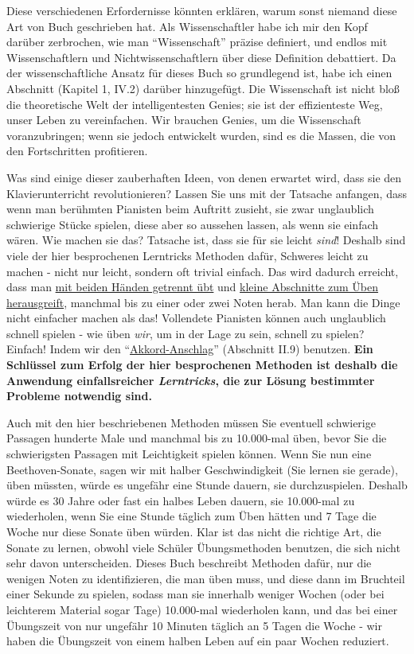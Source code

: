 Diese verschiedenen Erfordernisse könnten erklären, warum sonst niemand diese Art von Buch geschrieben hat.
Als Wissenschaftler habe ich mir den Kopf darüber zerbrochen, wie man \enquote{Wissenschaft} präzise definiert, und endlos mit Wissenschaftlern und Nichtwissenschaftlern über diese Definition debattiert.
Da der wissenschaftliche Ansatz für dieses Buch so grundlegend ist, habe ich einen Abschnitt (Kapitel 1, IV.2) darüber hinzugefügt.
Die Wissenschaft ist nicht bloß die theoretische Welt der intelligentesten Genies; sie ist der effizienteste Weg, unser Leben zu vereinfachen.
Wir brauchen Genies, um die Wissenschaft voranzubringen; wenn sie jedoch entwickelt wurden, sind es die Massen, die von den Fortschritten profitieren.

Was sind einige dieser zauberhaften Ideen, von denen erwartet wird, dass sie den Klavierunterricht revolutionieren?
Lassen Sie uns mit der Tatsache anfangen, dass wenn man berühmten Pianisten beim Auftritt zusieht, sie zwar unglaublich schwierige Stücke spielen, diese aber so aussehen lassen, als wenn sie einfach wären.
Wie machen sie das?
Tatsache ist, dass sie für sie leicht \textit{sind}!
Deshalb sind viele der hier besprochenen Lerntricks Methoden dafür, Schweres leicht zu machen - nicht nur leicht, sondern oft trivial einfach.
Das wird dadurch erreicht, dass man \hyperref[c1ii7]{mit beiden Händen getrennt übt} und \hyperref[c1ii6]{kleine Abschnitte zum Üben herausgreift}, manchmal bis zu einer oder zwei Noten herab.
Man kann die Dinge nicht einfacher machen als das!
Vollendete Pianisten können auch unglaublich schnell spielen - wie üben \textit{wir}, um in der Lage zu sein, schnell zu spielen?
Einfach!
Indem wir den \enquote{\hyperref[c1ii9]{Akkord-Anschlag}} (Abschnitt II.9) benutzen.
\textbf{Ein Schlüssel zum Erfolg der hier besprochenen Methoden ist deshalb die Anwendung einfallsreicher \textit{Lerntricks}, die zur Lösung bestimmter Probleme notwendig sind.}

Auch mit den hier beschriebenen Methoden müssen Sie eventuell schwierige Passagen hunderte Male und manchmal bis zu 10.000-mal üben, bevor Sie die schwierigsten Passagen mit Leichtigkeit spielen können.
Wenn Sie nun eine Beethoven-Sonate, sagen wir mit halber Geschwindigkeit (Sie lernen sie gerade), üben müssten, würde es ungefähr eine Stunde dauern, sie durchzuspielen.
Deshalb würde es 30 Jahre oder fast ein halbes Leben dauern, sie 10.000-mal zu wiederholen, wenn Sie eine Stunde täglich zum Üben hätten und 7 Tage die Woche nur diese Sonate üben würden.
Klar ist das nicht die richtige Art, die Sonate zu lernen, obwohl viele Schüler Übungsmethoden benutzen, die sich nicht sehr davon unterscheiden.
Dieses Buch beschreibt Methoden dafür, nur die wenigen Noten zu identifizieren, die man üben muss, und diese dann im Bruchteil einer Sekunde zu spielen, sodass man sie innerhalb weniger Wochen (oder bei leichterem Material sogar Tage) 10.000-mal wiederholen kann, und das bei einer Übungszeit von nur ungefähr 10 Minuten täglich an 5 Tagen die Woche - wir haben die Übungszeit von einem halben Leben auf ein paar Wochen reduziert.

